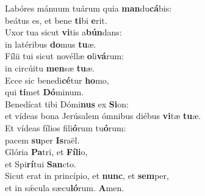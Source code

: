 \evenverse Labóres mánuum tuárum quia \textbf{man}du\textbf{cá}bis:~\*\\
\evenverse beátus es, et bene \textbf{ti}bi \textbf{e}rit.\\
\oddverse Uxor tua sicut \textbf{vi}tis a\textbf{bún}dans:~\*\\
\oddverse in latéribus \textbf{do}mus \textbf{tu}æ.\\
\evenverse Fílii tui sicut novéllæ \textbf{o}li\textbf{vá}rum:~\*\\
\evenverse in circúitu \textbf{men}sæ \textbf{tu}æ.\\
\oddverse Ecce sic benedi\textbf{cé}tur \textbf{ho}mo,~\*\\
\oddverse qui \textbf{ti}met \textbf{Dó}minum.\\
\evenverse Benedícat tibi Dómi\textbf{nus} ex \textbf{Si}on:~\*\\
\evenverse et vídeas bona Jerúsalem ómnibus diébus \textbf{vi}tæ \textbf{tu}æ.\\
\oddverse Et vídeas fílios fili\textbf{ó}rum tu\textbf{ó}rum:~\*\\
\oddverse pacem \textbf{su}per \textbf{Is}raël.\\
\evenverse Glória \textbf{Pa}tri, et \textbf{Fí}\textbf{li}o,~\*\\
\evenverse et Spi\textbf{rí}tui \textbf{San}cto.\\
\oddverse Sicut erat in princípio, et \textbf{nunc}, et \textbf{sem}per,~\*\\
\oddverse et in sǽcula sæcu\textbf{ló}rum. \textbf{A}men.\\
